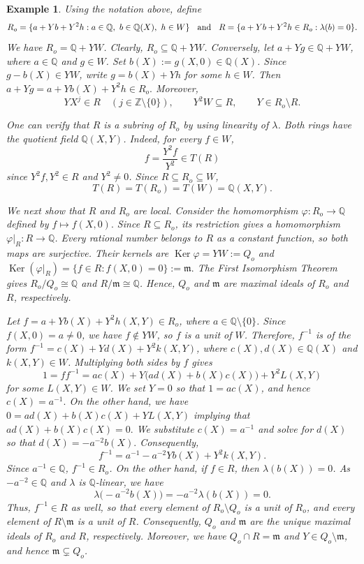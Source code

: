 \documentclass[12pt]{article}
\renewcommand{\ker}{\operatorname{Ker}}
\newtheorem{example}{Example}
\begin{document}
\begin{example}\label{counterexample-problem-30}
	Using the notation above, define
	\[ R_o= \{a+Yb+Y^2h: a\in\mathbb Q,\ b\in\mathbb Q(X),\ h\in W\} \hspace{2mm}\text{ and }\hspace{2mm}R=\{a+Yb+Y^2h\in R_o: \lambda (b) =0\}.\]
	We have $R_o=\mathbb Q+YW$. Clearly, $R_o\subseteq\mathbb Q+YW$. Conversely, let $a+Yg\in\mathbb Q+YW$, where $a\in\mathbb Q$ and $g\in W$. Set $b(X):=g(X,0)\in\mathbb Q(X)$.
	Since $g-b(X)\in YW$, write $g=b(X)+Yh$ for some $h\in W$. Then $a+Yg=a+Yb(X)+Y^2h\in R_o.$ Moreover, 
	\[ YX^j\in R \quad(j\in\mathbb Z\setminus\{0\}), \qquad Y^2W\subseteq R, \qquad Y\in R_o\setminus R. \]
	
	One can verify that $R$ is a subring of $R_o$ by using linearity of $\lambda$. Both rings have the quotient field $\mathbb Q(X,Y)$.
	Indeed, for every $f\in W$,
	\[ f=\frac{Y^2f}{Y^2}\in T(R) \]
	since $Y^2f,Y^2\in R$ and $Y^2\neq0$.
	Since $R\subseteq R_o\subseteq W$,
	\[  T(R) = T(R_o) = T(W) =\mathbb Q(X,Y). \]
	
	\smallskip
	We next show that $R$ and $R_o$ are local.
	Consider the homomorphism $\varphi:R_o\longrightarrow\mathbb Q $ defined by $f\longmapsto f(X,0).$ Since $R\subseteq R_o$, its restriction gives a homomorphism $\varphi|_R: R \longrightarrow \mathbb Q$. Every rational number belongs to $R$ as a constant function, so both maps are surjective. Their kernels are $\ker\varphi=YW:=Q_o$ and $\ker(\varphi|_R)=\{f\in R:f(X,0)=0\}:=\mathfrak m.$ The First Isomorphism Theorem gives $R_o/Q_o\cong \mathbb Q$ and $R/\mathfrak m\cong\mathbb Q$. Hence, $Q_o$ and $\mathfrak m$ are maximal ideals of $R_o$ and $R$, respectively.
	
	Let $f=a+Yb(X)+Y^2h(X,Y)\in R_o$, where $a\in\mathbb Q\setminus\{0\}$. Since $f(X,0)=a\neq0$, we have $f\notin YW$, so $f$ is a unit of $W$. Therefore, $f^{-1}$ is of the form $f^{-1}=c(X)+Yd(X)+Y^2k(X,Y)$, where $c(X),d(X)\in\mathbb Q(X)$ and $k(X,Y)\in W$. Multiplying both sides by $f$ gives
	\[1=ff^{-1}=ac(X)+Y\bigl(ad(X)+b(X)c(X)\bigr)+Y^2L(X,Y)\]
	for some $L(X,Y)\in W$. We set $Y=0$ so that $1=ac(X)$, and hence $c(X)=a^{-1}.$ On the other hand, we have $0=ad(X)+b(X)c(X)+YL(X,Y)$ implying that $ad(X)+b(X)c(X)=0.$ We substitute $c(X)=a^{-1}$ and solve for $d(X)$ so that $d(X)=-a^{-2}b(X).$ Consequently,
	\[ f^{-1}=a^{-1}-a^{-2}Yb(X)+Y^2k(X,Y). \]
	Since $a^{-1}\in\mathbb Q$, $f^{-1}\in R_o$. On the other hand, if $f\in R$, then $\lambda(b(X)) =0$. As $-a^{-2}\in\mathbb Q$ and $\lambda$ is $\mathbb Q$-linear, we have
	\[ \lambda\bigl(-a^{-2}b(X)\bigr) =-a^{-2}\lambda(b(X))=0. \]
	Thus, $f^{-1}\in R$ as well, so that every element of $R_o\setminus Q_o$ is a unit of $R_o$, and every element of $R\setminus\mathfrak m$ is a unit of $R$. Consequently, $Q_o$ and $\mathfrak m$ are the unique maximal ideals of $R_o$ and $R$, respectively. Moreover, we have $Q_o\cap R=\mathfrak m$ and $ Y\in Q_o\setminus\mathfrak m$, and hence $\mathfrak m\subsetneq Q_o$.
	

\end{example}
\end{document}
